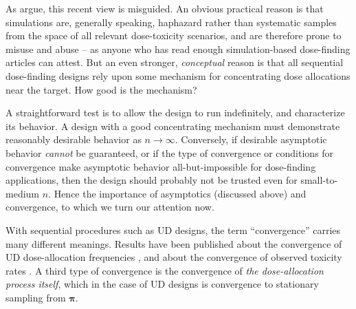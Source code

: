 As \cite{oron:azri:hoff:dose:2011} argue, this recent view is misguided. An obvious practical reason is that simulations are, generally speaking, haphazard rather than systematic samples from the space of all relevant dose-toxicity scenarios, and are therefore prone to misuse and abuse -- as anyone who has read enough simulation-based dose-finding articles can attest. But an even stronger,  \emph{conceptual} reason is that all sequential dose-finding designs rely upon some mechanism for concentrating dose allocations near the target. How good is the mechanism?

A straightforward test is to allow the design to run indefinitely, and characterize its behavior. A design with a good concentrating mechanism must demonstrate reasonably desirable behavior as $n\to\infty$. Conversely, if desirable asymptotic behavior \emph{cannot} be guaranteed, or if the type of convergence or conditions for convergence make asymptotic behavior all-but-impossible for dose-finding applications, then the design should probably not be trusted even for small-to-medium $n$. Hence the importance of asymptotics (discussed above) and convergence, to which we turn our attention now.

With sequential procedures such as UD designs, the term ``convergence'' carries many different meanings. Results have been published about the convergence of UD dose-allocation frequencies \citep{Durh:Flou:up-a:1995,Durh:Flou:Mont:up-a:1995}, and about the convergence of observed toxicity rates \citep{Flou:Durh:Rose:toxi:1995,oron:azri:hoff:dose:2011}. A third type of convergence is the convergence of \emph{the dose-allocation process itself}, which in the case of UD designs is convergence to stationary sampling from $\boldsymbol{\pi}$.

